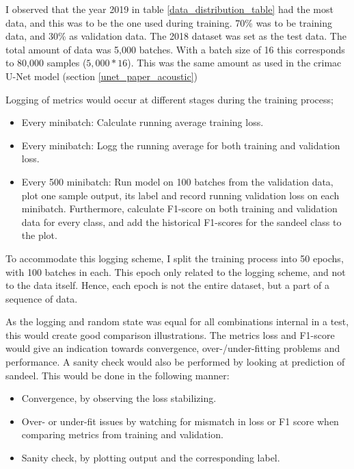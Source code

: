         I observed that the year 2019 in table \ref{data_distribution_table} had the most data, and this was to be the one used during training. 70\% was to be training data, and 30\% as validation data. The 2018 dataset was set as the test data. The total amount of data was 5,000 batches. With a batch size of 16 this corresponds to 80,000 samples ($5,000 * 16$). This was the same amount as used in the \gls{crimac} U-Net model (section \ref{unet_paper_acoustic})
        
        Logging of metrics would occur at different stages during the training process;
            \begin{itemize}
                \item Every minibatch: Calculate running average training loss.
                \item Every minibatch: Logg the running average for both training and validation loss.
                \item Every 500 minibatch: Run model on 100 batches from the validation data, plot one sample output, its label and record running validation loss on each minibatch. Furthermore, calculate F1-score on both training and validation data for every class, and add the historical F1-scores for the sandeel class to the plot. 
            \end{itemize}
        To accommodate this logging scheme, I split the training process into 50 epochs, with 100 batches in each. This epoch only related to the logging scheme, and not to the data itself. Hence, each epoch is not the entire dataset, but a part of a sequence of data.
    
        As the logging and random state was equal for all combinations internal in a test, this would create good comparison illustrations. The metrics loss and F1-score would give an indication towards convergence, over-/under-fitting problems and performance. A sanity check would also be performed by looking at prediction of sandeel. This would be done in the following manner:
        \begin{itemize}
            \item Convergence, by observing the loss stabilizing.
            \item Over- or under-fit issues by watching for mismatch in loss or F1 score when comparing metrics from training and validation.
            \item Sanity check, by plotting output and the corresponding label.
        \end{itemize}
        
